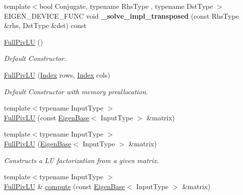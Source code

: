 \begin{DoxyCompactItemize}
\item 
\mbox{\label{group___l_u___module_a42cfd4d27becb5b0a4f2ccd007dd4fb3}} 
{\footnotesize template$<$bool Conjugate, typename Rhs\+Type , typename Dst\+Type $>$ }\\E\+I\+G\+E\+N\+\_\+\+D\+E\+V\+I\+C\+E\+\_\+\+F\+U\+NC void {\bfseries \+\_\+solve\+\_\+impl\+\_\+transposed} (const Rhs\+Type \&rhs, Dst\+Type \&dst) const
\item 
\hyperlink{group___l_u___module_a6e370c34e2f7e7ee1b122a76dc4cae9c}{Full\+Piv\+LU} ()
\begin{DoxyCompactList}\small\item\em Default Constructor. \end{DoxyCompactList}\item 
\hyperlink{group___l_u___module_acc9bf9c70a2a8b146d5b9419fddd6502}{Full\+Piv\+LU} (\hyperlink{group___core___module_a554f30542cc2316add4b1ea0a492ff02}{Index} rows, \hyperlink{group___core___module_a554f30542cc2316add4b1ea0a492ff02}{Index} cols)
\begin{DoxyCompactList}\small\item\em Default Constructor with memory preallocation. \end{DoxyCompactList}\item 
{\footnotesize template$<$typename Input\+Type $>$ }\\\hyperlink{group___l_u___module_a470c7997b565f43791f484e869f04908}{Full\+Piv\+LU} (const \hyperlink{group___core___module_struct_eigen_1_1_eigen_base}{Eigen\+Base}$<$ Input\+Type $>$ \&matrix)
\item 
{\footnotesize template$<$typename Input\+Type $>$ }\\\hyperlink{group___l_u___module_a31b167b0fd06c35ab53af27b4a05c065}{Full\+Piv\+LU} (\hyperlink{group___core___module_struct_eigen_1_1_eigen_base}{Eigen\+Base}$<$ Input\+Type $>$ \&matrix)
\begin{DoxyCompactList}\small\item\em Constructs a LU factorization from a given matrix. \end{DoxyCompactList}\item 
{\footnotesize template$<$typename Input\+Type $>$ }\\\hyperlink{group___l_u___module_class_eigen_1_1_full_piv_l_u}{Full\+Piv\+LU} \& \hyperlink{group___l_u___module_a0a3c3b1bbafa31a03567a4573ebabc79}{compute} (const \hyperlink{group___core___module_struct_eigen_1_1_eigen_base}{Eigen\+Base}$<$ Input\+Type $>$ \&matrix)

\end{DoxyCompactItemize}
